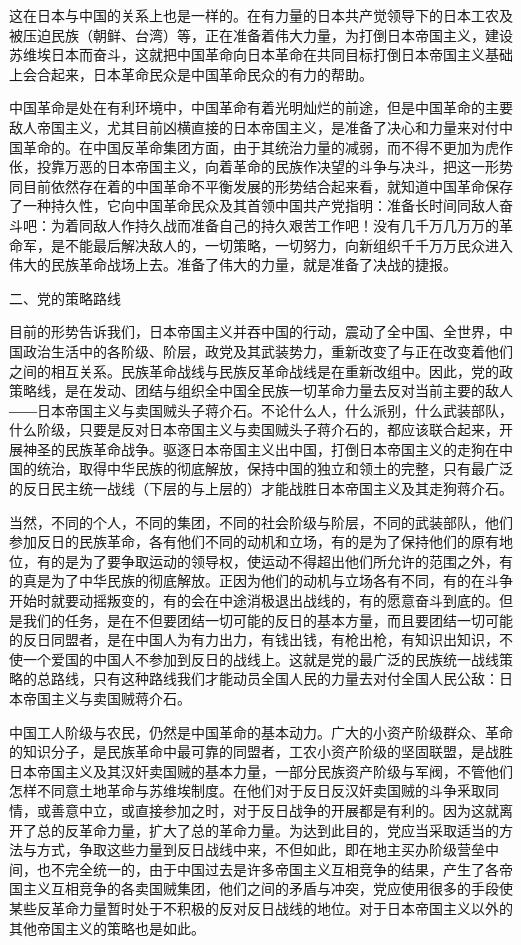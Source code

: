 这在日本与中国的关系上也是一样的。在有力量的日本共产觉领导下的日本工农及被压迫民族（朝鲜、台湾）等，正在准备着伟大力量，为打倒日本帝国主义，建设苏维埃日本而奋斗，这就把中国革命向日本革命在共同目标打倒日本帝国主义基础上会合起来，日本革命民众是中国革命民众的有力的帮助。

中国革命是处在有利环境中，中国革命有着光明灿烂的前途，但是中国革命的主要敌人帝国主义，尤其目前凶横直接的日本帝国主义，是准备了决心和力量来对付中国革命的。在中国反革命集团方面，由于其统治力量的减弱，而不得不更加为虎作伥，投靠万恶的日本帝国主义，向着革命的民族作决望的斗争与决斗，把这一形势同目前依然存在着的中国革命不平衡发展的形势结合起来看，就知道中国革命保存了一种持久性，它向中国革命民众及其首领中国共产党指明：准备长时间同敌人奋斗吧：为着同敌人作持久战而准备自己的持久艰苦工作吧！没有几千万几万万的革命军，是不能最后解决敌人的，一切策略，一切努力，向新组织千千万万民众进入伟大的民族革命战场上去。准备了伟大的力量，就是准备了决战的捷报。

二、党的策略路线

目前的形势告诉我们，日本帝国主义并吞中国的行动，震动了全中国、全世界，中国政治生活中的各阶级、阶层，政党及其武装势力，重新改变了与正在改变着他们之间的相互关系。民族革命战线与民族反革命战线是在重新改组中。因此，党的政策略线，是在发动、团结与组织全中国全民族一切革命力量去反对当前主要的敌人――日本帝国主义与卖国贼头子蒋介石。不论什么人，什么派别，什么武装部队，什么阶级，只要是反对日本帝国主义与卖国贼头子蒋介石的，都应该联合起来，开展神圣的民族革命战争。驱逐日本帝国主义出中国，打倒日本帝国主义的走狗在中国的统治，取得中华民族的彻底解放，保持中国的独立和领土的完整，只有最广泛的反日民主统一战线（下层的与上层的）才能战胜日本帝国主义及其走狗蒋介石。

当然，不同的个人，不同的集团，不同的社会阶级与阶层，不同的武装部队，他们参加反日的民族革命，各有他们不同的动机和立场，有的是为了保持他们的原有地位，有的是为了要争取运动的领导权，使运动不得超出他们所允许的范围之外，有的真是为了中华民族的彻底解放。正因为他们的动机与立场各有不同，有的在斗争开始时就要动摇叛变的，有的会在中途消极退出战线的，有的愿意奋斗到底的。但是我们的任务，是在不但要团结一切可能的反日的基本方量，而且要团结一切可能的反日同盟者，是在中国人为有力出力，有钱出钱，有枪出枪，有知识出知识，不使一个爱国的中国人不参加到反日的战线上。这就是党的最广泛的民族统一战线策略的总路线，只有这种路线我们才能动员全国人民的力量去对付全国人民公敌：日本帝国主义与卖国贼蒋介石。

中国工人阶级与农民，仍然是中国革命的基本动力。广大的小资产阶级群众、革命的知识分子，是民族革命中最可靠的同盟者，工农小资产阶级的坚固联盟，是战胜日本帝国主义及其汉奸卖国贼的基本力量，一部分民族资产阶级与军阀，不管他们怎样不同意土地革命与苏维埃制度。在他们对于反日反汉奸卖国贼的斗争釆取同情，或善意中立，或直接参加之时，对于反日战争的开展都是有利的。因为这就离开了总的反革命力量，扩大了总的革命力量。为达到此目的，党应当采取适当的方法与方式，争取这些力量到反日战线中来，不但如此，即在地主买办阶级营垒中间，也不完全统一的，由于中国过去是许多帝国主义互相竞争的结果，产生了各帝国主义互相竞争的各卖国贼集团，他们之间的矛盾与冲突，党应使用很多的手段使某些反革命力量暂时处于不积极的反对反日战线的地位。对于日本帝国主义以外的其他帝国主义的策略也是如此。

